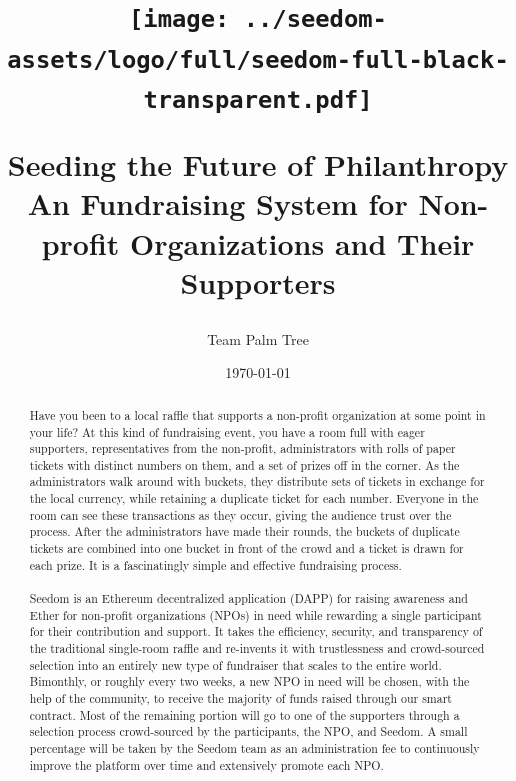 \documentclass[11pt]{article}
\begin{document}
\title{%
\begin{center}
\texttt{[image: ../seedom-assets/logo/full/seedom-full-black-transparent.pdf]}
\end{center}
\large Seeding the Future of Philanthropy \\[1mm]
\large An Fundraising System for Non-profit Organizations and Their Supporters \\[1mm]}
\author{Team Palm Tree}
\date{\today}
\maketitle

\begin{abstract}

Have you been to a local raffle that supports a non-profit organization at some point in your life? At this kind of fundraising event, you have a room full with eager supporters, representatives from the non-profit, administrators with rolls of paper tickets with distinct numbers on them, and a set of prizes off in the corner. As the administrators walk around with buckets, they distribute sets of tickets in exchange for the local currency, while retaining a duplicate ticket for each number. Everyone in the room can see these transactions as they occur, giving the audience trust over the process. After the administrators have made their rounds, the buckets of duplicate tickets are combined into one bucket in front of the crowd and a ticket is drawn for each prize. It is a fascinatingly simple and effective fundraising process.\\\\
Seedom is an Ethereum decentralized application (DAPP) for raising awareness and Ether for non-profit organizations (NPOs) in need while rewarding a single participant for their contribution and support. It takes the efficiency, security, and transparency of the traditional single-room raffle and re-invents it with trustlessness and crowd-sourced selection into an entirely new type of fundraiser that scales to the entire world. Bimonthly, or roughly every two weeks, a new NPO in need will be chosen, with the help of the community, to receive the majority of funds raised through our smart contract. Most of the remaining portion will go to one of the supporters through a selection process crowd-sourced by the participants, the NPO, and Seedom. A small percentage will be taken by the Seedom team as an administration fee to continuously improve the platform over time and extensively promote each NPO.

\end{abstract}
\pagebreak
\end{document}

